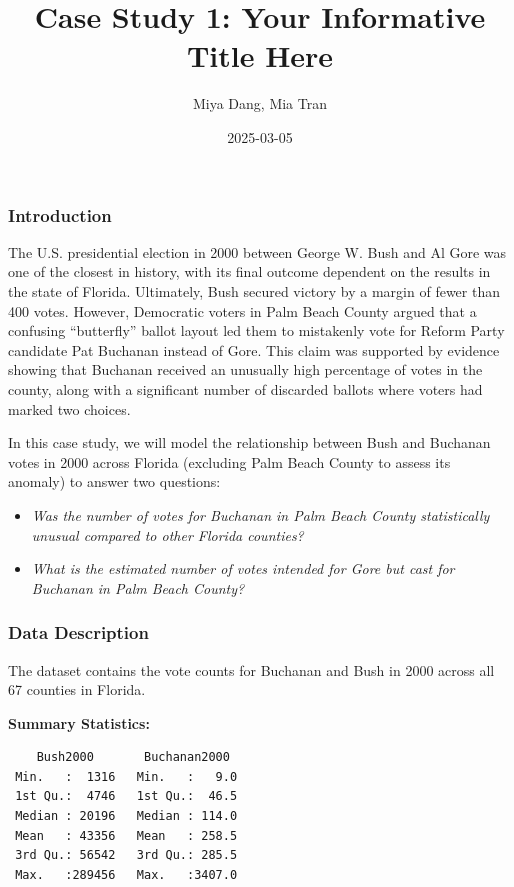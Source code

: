\documentclass[
  letterpaper,
  DIV=11,
  numbers=noendperiod]{scrartcl}
\title{Case Study 1: Your Informative Title Here}
\author{Miya Dang, Mia Tran}
\date{2025-03-05}
\providecommand{\tightlist}{%
  \setlength{\itemsep}{0pt}\setlength{\parskip}{0pt}}\usepackage{longtable,booktabs,array}
\begin{document}
\maketitle


\subsubsection{Introduction}\label{introduction}

The U.S. presidential election in 2000 between George W. Bush and Al
Gore was one of the closest in history, with its final outcome dependent
on the results in the state of Florida. Ultimately, Bush secured victory
by a margin of fewer than 400 votes. However, Democratic voters in Palm
Beach County argued that a confusing ``butterfly'' ballot layout led
them to mistakenly vote for Reform Party candidate Pat Buchanan instead
of Gore. This claim was supported by evidence showing that Buchanan
received an unusually high percentage of votes in the county, along with
a significant number of discarded ballots where voters had marked two
choices.

In this case study, we will model the relationship between Bush and
Buchanan votes in 2000 across Florida (excluding Palm Beach County to
assess its anomaly) to answer two questions:

\begin{itemize}
\tightlist
\item
  \emph{Was the number of votes for Buchanan in Palm Beach County
  statistically unusual compared to other Florida counties?}
\item
  \emph{What is the estimated number of votes intended for Gore but cast
  for Buchanan in Palm Beach County?}
\end{itemize}

\subsubsection{Data Description}\label{data-description}

The dataset contains the vote counts for Buchanan and Bush in 2000
across all 67 counties in Florida.

\textbf{Summary Statistics:}

\begin{verbatim}
    Bush2000       Buchanan2000   
 Min.   :  1316   Min.   :   9.0  
 1st Qu.:  4746   1st Qu.:  46.5  
 Median : 20196   Median : 114.0  
 Mean   : 43356   Mean   : 258.5  
 3rd Qu.: 56542   3rd Qu.: 285.5  
 Max.   :289456   Max.   :3407.0  
\end{verbatim}
\end{document}

